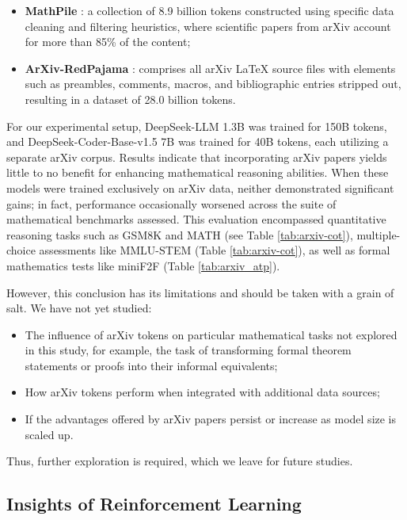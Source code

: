 \begin{itemize}[topsep=0pt]
\begin{itemize}[topsep=0pt]
    \item \textbf{MathPile} \citep{mathpile}: a collection of 8.9 billion tokens constructed using specific data cleaning and filtering heuristics, where scientific papers from arXiv account for more than 85\% of the content;
    \item \textbf{ArXiv-RedPajama} \citep{redpajama}: comprises all arXiv LaTeX source files with elements such as preambles, comments, macros, and bibliographic entries stripped out, resulting in a dataset of 28.0 billion tokens.
\end{itemize}

For our experimental setup, DeepSeek-LLM 1.3B was trained for 150B tokens, and DeepSeek-Coder-Base-v1.5 7B was trained for 40B tokens, each utilizing a separate arXiv corpus. Results indicate that incorporating arXiv papers yields little to no benefit for enhancing mathematical reasoning abilities. When these models were trained exclusively on arXiv data, neither demonstrated significant gains; in fact, performance occasionally worsened across the suite of mathematical benchmarks assessed. This evaluation encompassed quantitative reasoning tasks such as GSM8K and MATH (see Table \ref{tab:arxiv-cot}), multiple-choice assessments like MMLU-STEM (Table \ref{tab:arxiv-cot}), as well as formal mathematics tests like miniF2F (Table \ref{tab:arxiv_atp}).

However, this conclusion has its limitations and should be taken with a grain of salt. We have not yet studied:

\begin{itemize}[topsep=0pt]
    \item The influence of arXiv tokens on particular mathematical tasks not explored in this study, for example, the task of transforming formal theorem statements or proofs into their informal equivalents;
    \item How arXiv tokens perform when integrated with additional data sources;
    \item If the advantages offered by arXiv papers persist or increase as model size is scaled up.
\end{itemize}

Thus, further exploration is required, which we leave for future studies.

\subsection{Insights of Reinforcement Learning}

\end{itemize}
